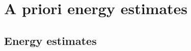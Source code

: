 \documentclass[12pt]{amsart}
\newcommand{\Bv}{{\boldsymbol{v}}}
\begin{document}
	
	
	
	
	
	\section{A priori energy estimates}\label{sec:A-priori}
	
	
	\subsection{Energy estimates}
	\label{subsec_EE}
	
\end{document}

